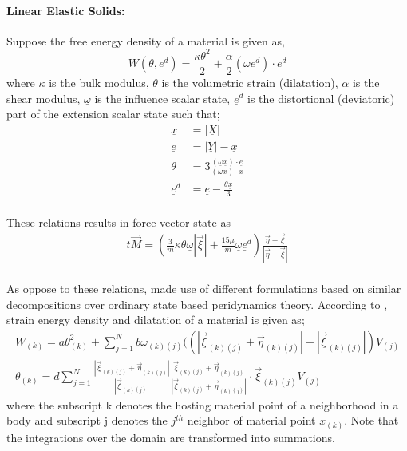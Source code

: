 \documentclass[10pt,a4paper,onecolumn]{article}
\begin{document}
\paragraph{Linear Elastic Solids:}
Suppose the free energy density of a material is given as, 
\begin{equation}
W(\theta,\underline{e}^d)=\frac{\kappa\theta^2}{2}+\frac{\alpha}{2}(\underline{\omega}\underline{e}^d)\cdot\underline{e}^d
\end{equation}
where $\kappa$ is the bulk modulus, $\theta$ is the volumetric strain (dilatation), $\alpha$ is the shear modulus, $\underline{\omega}$ is the influence scalar state, $\underline{e}^d$ is the distortional (deviatoric) part of the extension scalar state such that;
\begin{align}
\underline{x} &= |\underline{X}|\\
\underline{e}&=|\underline{Y}|-\underline{x}\\
\theta&= 3\frac{(\underline{\omega}\underline{x})\cdot\underline{e}}{(\underline{\omega}\underline{x})\cdot\underline{x}}\\
\underline{e}^d&= \underline{e}-\frac{\theta\underline{x}}{3}
\end{align}
\paragraph{}These relations results in force vector state as 
\begin{align}
t\vec{M} = \left(\frac{3}{m}\kappa\theta\underline{\omega}|\vec{\xi}| + \frac{15\mu}{m}\underline{\omega}\underline{e}^d\right) \frac{\vec{\eta}+\vec{\xi}}{|\vec{\eta}+\vec{\xi}|}
\end{align}
\paragraph{}
As oppose to these relations, \cite{MADENCI_OTERKUS} made use of different formulations based on similar decompositions over ordinary state based peridynamics theory. According to \cite{MADENCI_OTERKUS}, strain energy density and dilatation of a material is given as; 
\begin{align}
W_{(k)} = a\theta_{(k)}^2+\sum_{j=1}^{N}b\omega_{(k)(j)}((|\vec{\xi}_{(k)(j)}+\vec{\eta}_{(k)(j)}|-|\vec{\xi}_{(k)(j)}|)V_{(j)}\\
\label{eq:Dilat}
\theta_{(k)} = d \sum_{j=1}^{N} \frac{|\vec{\xi}_{(k)(j)}+\vec{\eta}_{(k)(j)}|}{|\vec{\xi}_{(k)(j)}|}\frac{\vec{\xi}_{(k)(j)}+\vec{\eta}_{(k)(j)}}{|\vec{\xi}_{(k)(j)}+\vec{\eta}_{(k)(j)}|}\cdot\vec{\xi}_{(k)(j)}V_{(j)}
\end{align}
where the subscript k denotes the hosting material point of a neighborhood in a body and subscript j denotes the $j^{th}$ neighbor of material point $x_{(k)}$. Note that the integrations over the domain are transformed into summations. 
\end{document}

